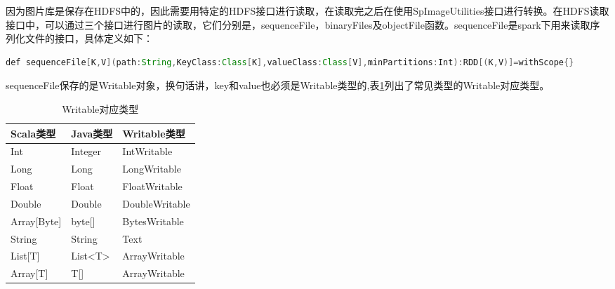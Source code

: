 因为图片库是保存在HDFS中的，因此需要用特定的HDFS接口进行读取，在读取完之后在使用SpImageUtilities接口进行转换。在HDFS读取接口中，可以通过三个接口进行图片的读取，它们分别是，sequenceFile，binaryFiles及objectFile函数。sequenceFile是spark下用来读取序列化文件的接口，具体定义如下：
\begin{lstlisting}[language=Java,numbers=none]
def sequenceFile[K,V](path:String,KeyClass:Class[K],valueClass:Class[V],minPartitions:Int):RDD[(K,V)]=withScope{}
\end{lstlisting}
sequenceFile保存的是Writable对象，换句话讲，key和value也必须是Writable类型的,表\ref{tab:Writable}列出了常见类型的Writable对应类型。
\begin{table}[h] %
\caption{Writable对应类型} %
\centering
\label{tab:Writable}
\begin{tabular}{p{4cm}|p{2cm}|p{6cm}} %
\hline
\hline
Scala类型  & Java类型 & Writable类型 \\ %
\hline %
Int  & Integer & IntWritable\\
\hline
Long  & Long & LongWritable\\
\hline
Float  & Float & FloatWritable\\
\hline
Double  & Double & DoubleWritable\\
\hline
Array[Byte]  & byte[] & BytesWritable\\
\hline
String  & String & Text\\
\hline
List[T] & List<T> & ArrayWritable\\
\hline
Array[T] & T[] & ArrayWritable\\
\hline
\hline
\end{tabular}
\end{table}

